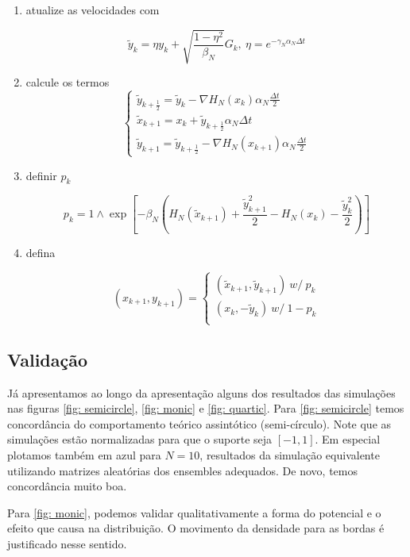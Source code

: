 \begin{enumerate}
	\item atualize as velocidades com
	
	\[
	\tilde{y}_k = \eta y_k + \sqrt{\frac{1-\eta^2}{\beta_N}} G_k, \ \eta = e^{-\gamma_N \alpha_N \Delta t}
	\]
	
	\item calcule os termos
	\[
	\begin{cases}
		\tilde{y}_{k+\frac{1}{2}} = \tilde{y}_k - \nabla H_N(x_k) \alpha_N \frac{\Delta t}{2} \\
		\tilde{x}_{k+1} = x_k + \tilde{y}_{k + \frac{1}{2}} \alpha_N \Delta t \\
		\tilde{y}_{k+1} = \tilde{y}_{k+\frac{1}{2}} - \nabla H_N(x_{k+1}) \alpha_N \frac{\Delta t}{2}
	\end{cases}
	\]
	
	\item definir $p_k$
	
	\[
	p_k = 1 \wedge \exp{\left[ -\beta_N \left(  H_N(\tilde{x}_{k+1}) + \frac{\tilde{y}^2_{k+1}}{2} - H_N(x_k) - \frac{\tilde{y}^2_k}{2} \right)\right] }
	\]
	
	\item defina
	
	\[
	(x_{k+1}, y_{k+1}) = 
	\begin{cases}
		(\tilde{x}_{k+1}, \tilde{y}_{k+1}) \ w/ \ p_k \\
		(x_k, -\tilde{y}_{k}) \ w/ \ 1-p_k \\
	\end{cases}
	\]
	
\end{enumerate}

\subsection{Validação}

Já apresentamos ao longo da apresentação alguns dos resultados das simulações nas figuras \ref{fig: semicircle}, \ref{fig: monic} e \ref{fig: quartic}. Para \ref{fig: semicircle} temos concordância do comportamento teórico assintótico (semi-círculo). Note que as simulações estão normalizadas para que o suporte seja $[-1,1]$. Em especial plotamos também em azul para $N=10$, resultados da simulação equivalente utilizando matrizes aleatórias dos ensembles adequados. De novo, temos concordância muito boa.

Para \ref{fig: monic}, podemos validar qualitativamente a forma do potencial e o efeito que causa na distribuição. O movimento da densidade para as bordas é justificado nesse sentido.

